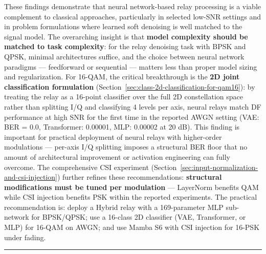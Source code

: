 These findings demonstrate that neural network-based relay processing is a viable complement to classical approaches, particularly in selected low-SNR settings and in problem formulations where learned soft denoising is well matched to the signal model. The overarching insight is that \textbf{model complexity should be matched to task complexity}: for the relay denoising task with BPSK and QPSK, minimal architectures suffice, and the choice between neural network paradigms --- feedforward or sequential --- matters less than proper model sizing and regularization. For 16-QAM, the critical breakthrough is the \textbf{2D joint classification formulation} (Section~\ref{sec:class-2d-classification-for-qam16}): by treating the relay as a 16-point classifier over the full 2D constellation space rather than splitting I/Q and classifying 4 levels per axis, neural relays match DF performance at high SNR for the first time in the reported AWGN setting (VAE: BER = 0.0, Transformer: 0.00001, MLP: 0.00002 at 20 dB). This finding is important for practical deployment of neural relays with higher-order modulations --- per-axis I/Q splitting imposes a structural BER floor that no amount of architectural improvement or activation engineering can fully overcome. The comprehensive CSI experiment (Section~\ref{sec:input-normalization-and-csi-injection}) further refines these recommendations: \textbf{structural modifications must be tuned per modulation} --- LayerNorm benefits QAM while CSI injection benefits PSK within the reported experiments. The practical recommendation is: deploy a Hybrid relay with a 169-parameter MLP sub-network for BPSK/QPSK; use a 16-class 2D classifier (VAE, Transformer, or MLP) for 16-QAM on AWGN; and use Mamba S6 with CSI injection for 16-PSK under fading.

\begin{center}\rule{0.5\linewidth}{0.5pt}\end{center}

